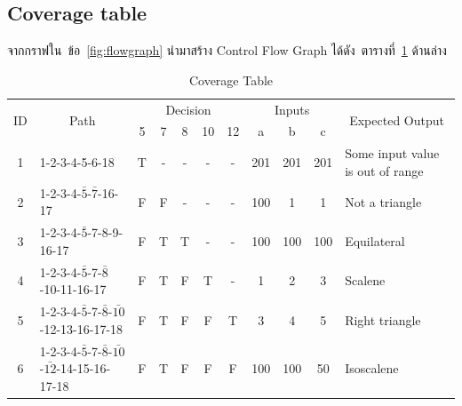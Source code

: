 \documentclass[12pt,a4paper]{article}
\newcommand{\outbound}{Some input value is out of range}
\newcommand{\nottriangle}{Not a triangle}
\newcommand{\equ}{Equilateral}
\newcommand{\sca}{Scalene}
\newcommand{\iso}{Isoscalene}
\newcommand{\numbername}{ข้อ}
\newcommand{\righttri}{Right triangle}
\renewcommand{\tablename}{ตารางที่}
\begin{document}
\newpage
\clearpage
\begin{landscape}
    \section{Coverage table}
    จากกราฟใน~\numbername~\ref{fig:flowgraph} นำมาสร้าง Control Flow Graph ได้ดัง~\tablename~\ref{tab:coveragetable} ด้านล่าง
    \label{sec:coveragetable}
    \begin{table}[hb!]
        \caption{Coverage Table}
        \label{tab:coveragetable}
        \begin{center}
            \begin{tabular}[p]{ | c | l | *{8}{c|} l |}
                \hline
                \multirow{2}{*}{ID} & \multicolumn{1}{c}{\multirow{2}{*}{Path}} & \multicolumn{5}{|c|}{Decision} & \multicolumn{3}{|c|}{Inputs} & \multicolumn{1}{c|}{\multirow{2}{*}{Expected Output}} \\ \cline{3-10}
                                    &                                                   & 5  & 7  & 8  & 10 & 12 & a   & b   & c   &                \\ \hline
                1 & 1-2-3-4-5-6-18                                                      & T  & -  & -  & -  & -  & 201 & 201 & 201 & \outbound      \\ \hline
                2 & 1-2-3-4-$\bar{5}$-$\bar{7}$-16-17                                   & F  & F  & -  & -  & -  & 100 &   1 &   1 & \nottriangle   \\ \hline
                3 & 1-2-3-4-$\bar{5}$-7-8-9-16-17                                       & F  & T  & T  & -  & -  & 100 & 100 & 100 & \equ           \\ \hline
                4 & 1-2-3-4-$\bar{5}$-7-$\bar{8}$-10-11-16-17                           & F  & T  & F  & T  & -  &   1 &   2 &   3 & \sca           \\ \hline
                5 & 1-2-3-4-$\bar{5}$-7-$\bar{8}$-$\bar{10}$-12-13-16-17-18             & F  & T  & F  & F  & T  &   3 &   4 &   5 & \righttri      \\ \hline
                6 & 1-2-3-4-$\bar{5}$-7-$\bar{8}$-$\bar{10}$-$\bar{12}$-14-15-16-17-18  & F  & T  & F  & F  & F  & 100 & 100 &  50 & \iso           \\ \hline
            \end{tabular}
        \end{center}
    \end{table}

\end{landscape}
\end{document}
